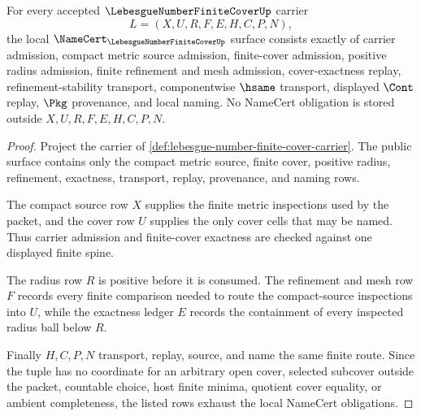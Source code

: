 \begin{theorem}
\label{thm:lebesgue-number-finite-cover-namecert-obligations}
For every accepted $\LebesgueNumberFiniteCoverUp$ carrier
$$
L=(X,U,R,F,E,H,C,P,N),
$$
the local $\NameCert_{\LebesgueNumberFiniteCoverUp}$ surface consists exactly of carrier admission, compact metric source admission, finite-cover admission, positive radius admission, finite refinement and mesh admission, cover-exactness replay, refinement-stability transport, componentwise $\hsame$ transport, displayed $\Cont$ replay, $\Pkg$ provenance, and local naming. No NameCert obligation is stored outside $X,U,R,F,E,H,C,P,N$.
\end{theorem}
\begin{proof}
Project the carrier of \autoref{def:lebesgue-number-finite-cover-carrier}. The public surface contains only the compact metric source, finite cover, positive radius, refinement, exactness, transport, replay, provenance, and naming rows.

The compact source row $X$ supplies the finite metric inspections used by the packet, and the cover row $U$ supplies the only cover cells that may be named. Thus carrier admission and finite-cover exactness are checked against one displayed finite spine.

The radius row $R$ is positive before it is consumed. The refinement and mesh row $F$ records every finite comparison needed to route the compact-source inspections into $U$, while the exactness ledger $E$ records the containment of every inspected radius ball below $R$.

Finally $H,C,P,N$ transport, replay, source, and name the same finite route. Since the tuple has no coordinate for an arbitrary open cover, selected subcover outside the packet, countable choice, host finite minima, quotient cover equality, or ambient completeness, the listed rows exhaust the local NameCert obligations.
\end{proof}

